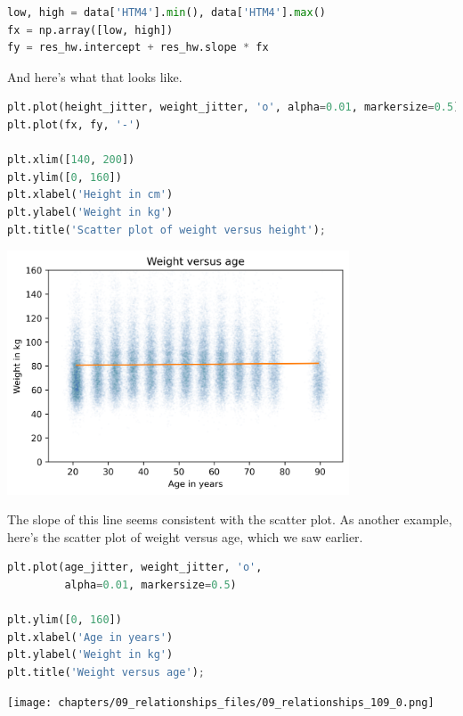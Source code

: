 \begin{lstlisting}[language=Python,style=source]
low, high = data['HTM4'].min(), data['HTM4'].max()
fx = np.array([low, high])
fy = res_hw.intercept + res_hw.slope * fx
\end{lstlisting}

And here's what that looks like.

\begin{lstlisting}[language=Python,style=source]
plt.plot(height_jitter, weight_jitter, 'o', alpha=0.01, markersize=0.5)
plt.plot(fx, fy, '-')

plt.xlim([140, 200])
plt.ylim([0, 160])
plt.xlabel('Height in cm')
plt.ylabel('Weight in kg')
plt.title('Scatter plot of weight versus height');
\end{lstlisting}

\begin{center}
\includegraphics[width=4in]{chapters/09_relationships_files/09_relationships_107_0.png}
\end{center}

The slope of this line seems consistent with the scatter plot. As
another example, here's the scatter plot of weight versus age, which we
saw earlier.

\begin{lstlisting}[language=Python,style=source]
plt.plot(age_jitter, weight_jitter, 'o', 
         alpha=0.01, markersize=0.5)

plt.ylim([0, 160])
plt.xlabel('Age in years')
plt.ylabel('Weight in kg')
plt.title('Weight versus age');
\end{lstlisting}

\begin{center}
\texttt{[image: chapters/09\_relationships\_files/09\_relationships\_109\_0.png]}
\end{center}

